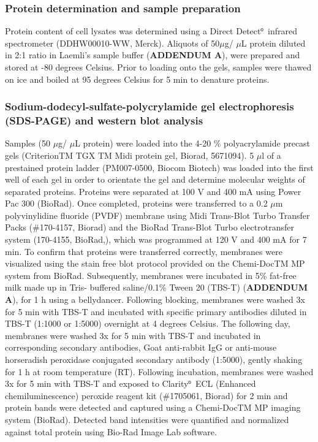 \subsubsection{Protein determination and sample preparation}
Protein content of cell lysates was determined using a Direct Detect${\textsuperscript{\tiny{\textregistered}}}$ infrared spectrometer (DDHW00010-WW, Merck). Aliquots of 50$\mu$g/ $\mu$L protein diluted in 2:1 ratio in Laemli’s sample buffer (\textbf{ADDENDUM A}), were prepared and stored at -80 degrees Celsius. Prior to loading onto the gels, samples were thawed on ice and boiled at 95 degrees Celsius for 5 min to denature proteins.

\subsubsection{Sodium-dodecyl-sulfate-polycrylamide gel electrophoresis (SDS-PAGE) and western blot analysis}
Samples (50 $\mu$g/ $\mu$L protein) were loaded into the 4-20 \% polyacrylamide precast gels (CriterionTM TGX TM Midi protein gel, Biorad, 5671094). 5 $\mu$l of a prestained protein ladder (PM007-0500, Biocom Biotech) was loaded into the first well of each gel in order to orientate the gel and determine molecular weights of separated proteins. Proteins were separated at 100 V and 400 mA using Power Pac 300 (BioRad). Once completed, proteins were transferred to a 0.2 $\mu$m polyvinylidine fluoride (PVDF) membrane using Midi Trans-Blot Turbo Transfer Packs (\#170-4157, Biorad) and the BioRad Trans-Blot Turbo electrotransfer system (170-4155, BioRad,), which was programmed at 120 V and 400 mA for 7 min. To confirm that proteins were transferred correctly, membranes were visualized using the stain free blot protocol provided on the Chemi-DocTM MP system from BioRad. Subsequently, membranes were incubated in 5\% fat-free milk made up in Tris- buffered saline/0.1\% Tween 20 (TBS-T) (\textbf{ADDENDUM A}), for 1 h using a bellydancer. Following blocking, membranes were washed 3x for 5 min with TBS-T and incubated with specific primary antibodies diluted in TBS-T (1:1000 or 1:5000) overnight at 4 degrees Celsius. The following day, membranes were washed 3x for 5 min with TBS-T and incubated in corresponding secondary antibodies, Goat anti-rabbit IgG or anti-mouse horseradish peroxidase conjugated secondary antibody (1:5000), gently shaking for 1 h at room temperature (RT). Following incubation, membranes were washed 3x for 5 min with TBS-T and exposed to Clarity${\textsuperscript{\tiny{\textregistered}}}$ ECL (Enhanced chemiluminescence) peroxide reagent kit (\#1705061, Biorad) for 2 min and protein bands were detected and captured using a Chemi-DocTM MP imaging system (BioRad). Detected band intensities were quantified and normalized against total protein using Bio-Rad Image Lab software.

